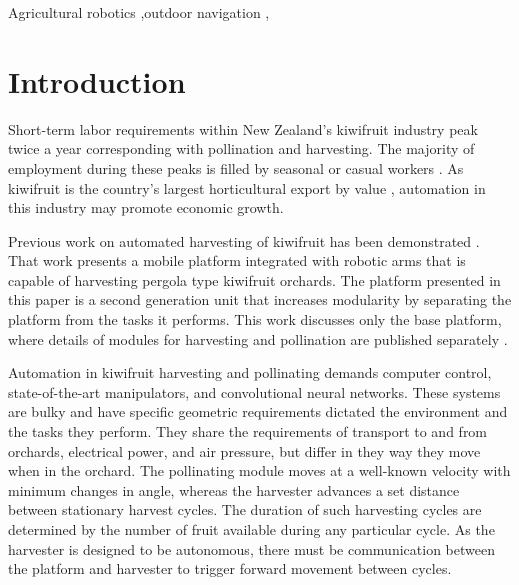 \documentclass[preprint,authoryear,12pt]{elsarticle}
\begin{document}
\begin{frontmatter}
\begin{keyword}

    Agricultural robotics \sep outdoor navigation \sep
\end{keyword}

\end{frontmatter}


\section{Introduction}
\label{sect:intro}
    Short-term labor requirements within New Zealand's kiwifruit industry peak twice a year corresponding with pollination and harvesting.
    The majority of employment during these peaks is filled by seasonal or casual workers \citep{Timmins2009}.
    As kiwifruit is the country's largest horticultural export by value \citep{StatisticsNewZealand2015}, automation in this industry may promote economic growth.

    Previous work on automated harvesting of kiwifruit has been demonstrated \citep{Scarfe2012,scarfe2009}.
    That work presents a mobile platform integrated with robotic arms that is capable of harvesting pergola type kiwifruit orchards.
    The platform presented in this paper is a second generation unit that increases modularity by separating the platform from the tasks it performs.
    This work discusses only the base platform, where details of modules for harvesting and pollination are published separately \citep{williams2017,Seabright2017}.

    Automation in kiwifruit harvesting and pollinating demands computer control, state-of-the-art manipulators, and convolutional neural networks.
    These systems are bulky and have specific geometric requirements dictated the environment and the tasks they perform.
    They share the requirements of transport to and from orchards, electrical power, and air pressure, but differ in they way they move when in the orchard.
    The pollinating module moves at a well-known velocity with minimum changes in angle, whereas the harvester advances a set distance between stationary harvest cycles.
    The duration of such harvesting cycles are determined by the number of fruit available during any particular cycle.
    As the harvester is designed to be autonomous, there must be communication between the platform and harvester to trigger forward movement between cycles.
\end{document}
